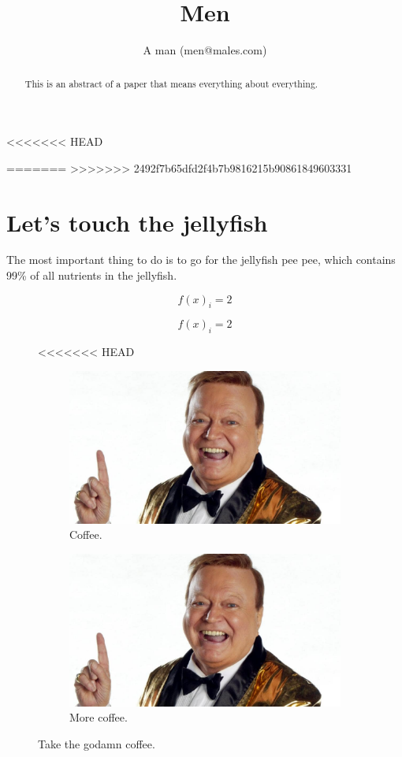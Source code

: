 \documentclass[]{article}
\title{Men}
\author{A man (men@males.com)}
\begin{document}
\maketitle

\begin{abstract}
This is an abstract of a paper that means everything about everything.
\end{abstract}
<<<<<<< HEAD

\tableofcontents
\newpage

=======
\tableofcontents
\newpage
>>>>>>> 2492f7b65dfd2f4b7b9816215b90861849603331
\section{Let's touch the jellyfish}
The most important thing to do is to go for the jellyfish pee pee, which contains 99\% of all nutrients in the jellyfish.

\begin{equation}
f(x)_{i} = 2
\end{equation}

\begin{equation*}
f(x)_{i} = 2
\end{equation*}
\begin{figure}[h!]
<<<<<<< HEAD
	\centering
	\begin{subfigure}[b]{0.4\linewidth}
		\includegraphics[width=\linewidth]{ims/bert2.jpg}
		\caption{Coffee.}
	\end{subfigure}
	\begin{subfigure}[b]{0.4\linewidth}
		\includegraphics[width=\linewidth]{ims/bert2.jpg}
		\caption{More coffee.}
	\end{subfigure}
	\caption{Take the godamn coffee.}
	\label{fig:coffee}
\end{figure}
\end{document}
